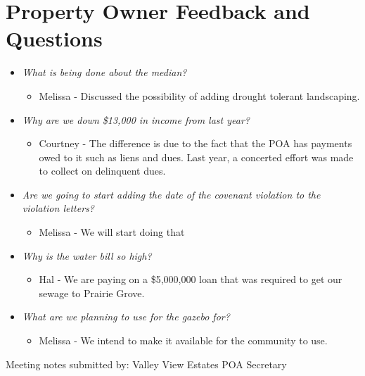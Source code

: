 \documentclass[12pt,a4paper]{article}
\begin{document}
\section*{Property Owner Feedback and Questions}
\begin{itemize}
  \item \textit{What is being done about the median?}
    \begin{itemize}
      \item Melissa - Discussed the possibility of adding drought tolerant landscaping.
    \end{itemize}
  \item \textit{Why are we down \$13,000 in income from last year?}
    \begin{itemize}
      \item Courtney - The difference is due to the fact that the POA has payments owed to it such as liens and dues.
        Last year, a concerted effort was made to collect on delinquent dues.
    \end{itemize}
  \item \textit{Are we going to start adding the date of the covenant violation to the violation letters?}
    \begin{itemize}
      \item Melissa - We will start doing that
    \end{itemize}
  \item \textit{Why is the water bill so high?}
    \begin{itemize}
      \item Hal - We are paying on a \$5,000,000 loan that was required to get our sewage to Prairie Grove.
    \end{itemize}
  \item \textit{What are we planning to use for the gazebo for?}
    \begin{itemize}
      \item Melissa - We intend to make it available for the community to use.
    \end{itemize}
\end{itemize}

\begin{flushleft}
Meeting notes submitted by:\break{}
\@author\break{}
Valley View Estates POA Secretary
\end{flushleft}
\end{document}
